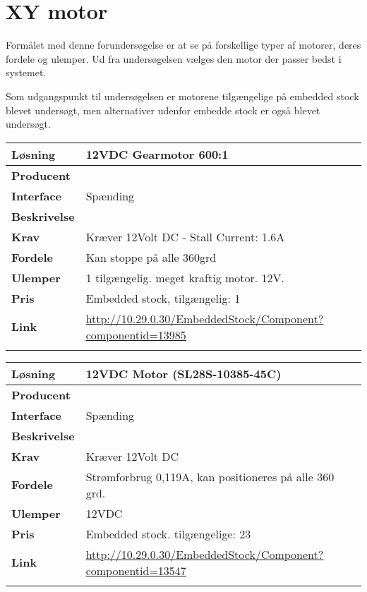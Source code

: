 \section{XY motor}
Formålet med denne forundersøgelse er at se på forskellige typer af motorer, deres fordele og ulemper. Ud fra undersøgelsen vælges den motor der passer bedst i systemet.

Som udgangspunkt til undersøgelsen er motorene tilgængelige på embedded stock blevet undersøgt, men alternativer udenfor embedde stock er også blevet undersøgt. 

\begin{table}[H] \centering
\begin{tabular}{|p{3cm}|p{11cm}|}
	\hline
	\textbf{Løsning}		
	    & 12VDC Gearmotor 600:1
	\\ \hline
	\textbf{Producent} 		
	    & 
	\\ \hline
	\textbf{Interface} 		
	    & Spænding
	 \\ \hline
	\textbf{Beskrivelse} 	
	    & 
	\\ \hline
	\textbf{Krav} 			
	    & Kræver 12Volt DC - Stall Current: 1.6A
	\\ \hline
	\textbf{Fordele}		
	    & Kan stoppe på alle 360grd
	\\ \hline
	\textbf{Ulemper} 		
	    & 1 tilgængelig. meget kraftig motor. 12V.
	\\ \hline
	\textbf{Pris} 			
	    & Embedded stock, tilgængelig: 1
	\\ \hline
	\textbf{Link} 			
	    & \url{http://10.29.0.30/EmbeddedStock/Component?componentid=13985}
	\\ \hline
	\multicolumn{2}{|c|}{} 
    \\ \hline
\end{tabular}
\end{table}

\begin{table}[H] \centering
\begin{tabular}{|p{3cm}|p{11cm}|}
	\hline
	\textbf{Løsning}		
	    & 12VDC Motor (SL28S-10385-45C)
	\\ \hline
	\textbf{Producent} 		
	    & 
	\\ \hline
	\textbf{Interface} 		
	    & Spænding
	\\ \hline
	\textbf{Beskrivelse} 	
	    & 
	\\ \hline
	\textbf{Krav} 			
	    & Kræver 12Volt DC
	\\ \hline
	\textbf{Fordele}		
	    & Strømforbrug 0,119A, kan positioneres på alle 360 grd.
	\\ \hline
	\textbf{Ulemper} 		
	    & 12VDC
	\\ \hline
	\textbf{Pris} 			
	    & Embedded stock. tilgængelige: 23
	\\ \hline
	\textbf{Link} 			
	    & \url{http://10.29.0.30/EmbeddedStock/Component?componentid=13547} 
	\\ \hline
	\multicolumn{2}{|c|}{} 
    \\ \hline
\end{tabular}
\end{table}

